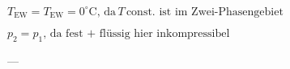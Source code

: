 \( T_{\text{EW}} = T_{\text{EW}} = 0^\circ \text{C}, \, \text{da} \, T \, \text{const. ist im Zwei-Phasengebiet} \)  

\( p_2 = p_1, \, \text{da fest + flüssig hier inkompressibel} \)  

---
